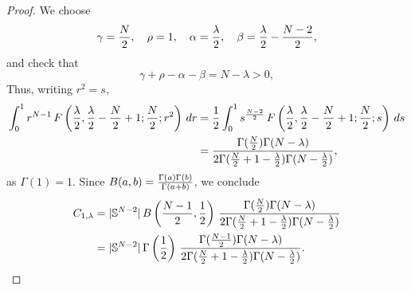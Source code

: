\documentclass[10pt,reqno,english]{amsart}
\theoremstyle{definition}
\numberwithin{equation}{section}
\begin{document}
\begin{proof}
We choose
\[
\gamma ={N \over 2} , \quad \rho=1, \quad \alpha ={\lambda \over 2}, \quad \beta = {\lambda \over 2} -{N-2 \over 2},
\]
and check that
\[
\gamma +\rho -\alpha - \beta = N-\lambda >0,
\]
Thus, writing $r^2 = s$,
\begin{align*}
    \int_0^1 r^{N-1 }  \, F\left({\lambda \over 2} , {\lambda \over 2} -{N \over 2} +1 ; {N\over 2}; r^2\right) \, dr  &={1\over 2} \int_0^1 s^{N-2 \over 2} \, F\left({\lambda \over 2} , {\lambda \over 2} -{N \over 2} +1 ; {N\over 2}; s\right) \, ds\\
    &= {\Gamma ({N\over 2}) \Gamma (N-\lambda) \over 2 \Gamma ({N\over 2} + 1-{\lambda \over 2}) \Gamma (N-{\lambda \over 2}) },
\end{align*}
as $\Gamma (1) =1$.
Since $B(a,b)={\Gamma (a) \Gamma (b) \over \Gamma (a+b)}$, we conclude
\begin{align*}
    C_{1, \lambda}&= |\mathbb S^{N-2}| \, B\left({N-1 \over 2}, {1\over 2}\right) \, {\Gamma ({N\over 2}) \Gamma (N-\lambda) \over 2 \Gamma ({N\over 2} + 1-{\lambda \over 2}) \Gamma (N-{\lambda \over 2}) }\\
    &= |\mathbb S^{N-2}| \, \Gamma \left( {1\over 2}\right) \, {\Gamma ({N-1\over 2}) \Gamma (N-\lambda) \over 2 \Gamma ({N\over 2} + 1-{\lambda \over 2}) \Gamma (N-{\lambda \over 2}) }.\qedhere
\end{align*}
\end{proof}
\end{document}
